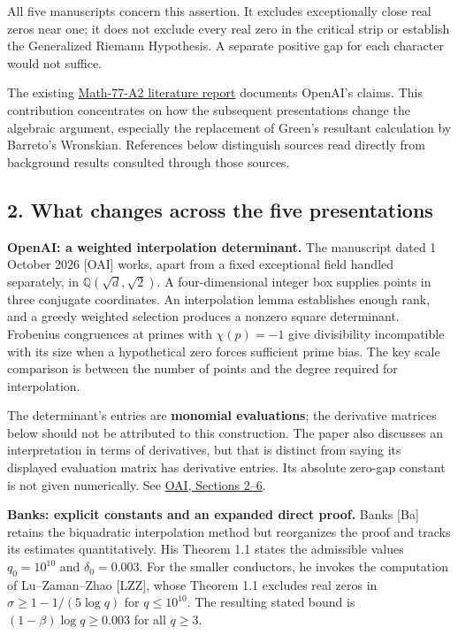 \documentclass[11pt]{article}
\begin{document}
All five manuscripts concern this assertion. It excludes exceptionally close real zeros near one; it does not exclude every real zero in the critical strip or establish the Generalized Riemann Hypothesis. A separate positive gap for each character would not suffice.

The existing \href{https://we-solve.github.io/contributions/siegel-zeros/attempt-2/r1/}{Math-77-A2 literature report} documents OpenAI's claims. This contribution concentrates on how the subsequent presentations change the algebraic argument, especially the replacement of Green's resultant calculation by Barreto's Wronskian. References below distinguish sources read directly from background results consulted through those sources.

\subsection{2. What changes across the five presentations}\label{what-changes-across-the-five-presentations}

\textbf{OpenAI: a weighted interpolation determinant.} The manuscript dated 1 October 2026 {[}OAI{]} works, apart from a fixed exceptional field handled separately, in \(\mathbb Q(\sqrt d,\sqrt2)\). A four-dimensional integer box supplies points in three conjugate coordinates. An interpolation lemma establishes enough rank, and a greedy weighted selection produces a nonzero square determinant. Frobenius congruences at primes with \(\chi(p)=-1\) give divisibility incompatible with its size when a hypothetical zero forces sufficient prime bias. The key scale comparison is between the number of points and the degree required for interpolation.

The determinant's entries are \textbf{monomial evaluations}; the derivative matrices below should not be attributed to this construction. The paper also discusses an interpretation in terms of derivatives, but that is distinct from saying its displayed evaluation matrix has derivative entries. Its absolute zero-gap constant is not given numerically. See \href{https://github.com/openai/math/blob/adc7f1241b42e322a6451854ab7e4b4c146bf78a/preprints/Uniform-exclusion-of-Landau-Siegel-zeros-October-1-2026/build/paper.tex}{OAI, Sections 2--6}.

\textbf{Banks: explicit constants and an expanded direct proof.} Banks {[}Ba{]} retains the biquadratic interpolation method but reorganizes the proof and tracks its estimates quantitatively. His Theorem 1.1 states the admissible values \(q_0=10^{10}\) and \(\delta_0=0.003\). For the smaller conductors, he invokes the computation of Lu--Zaman--Zhao {[}LZZ{]}, whose Theorem 1.1 excludes real zeros in \(\sigma\ge1-1/(5\log q)\) for \(q\le10^{10}\). The resulting stated bound is \((1-\beta)\log q\ge0.003\) for all \(q\ge3\).
\end{document}
